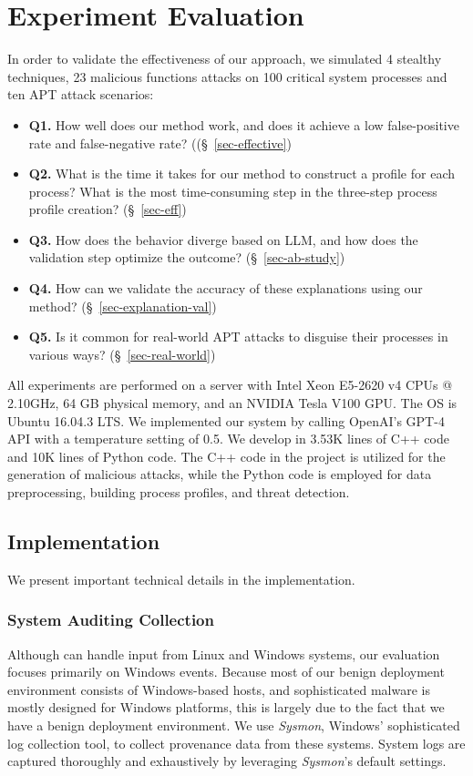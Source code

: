 \section{Experiment Evaluation}

In order to validate the effectiveness of our approach, we simulated 4 stealthy techniques, 23 malicious functions attacks on 100 critical system processes and ten APT attack scenarios:

\begin{itemize}
    \item \textbf{Q1.} How well does our method work, and does it achieve a low false-positive rate and false-negative rate? ((§~\ref{sec-effective})
    \item \textbf{Q2.} What is the time it takes for our method to construct a profile for each process? What is the most time-consuming step in the three-step process profile creation? (§~\ref{sec-eff})
    \item \textbf{Q3.} How does the behavior diverge based on LLM, and how does the validation step optimize the outcome? (§~\ref{sec-ab-study})
    \item \textbf{Q4.} How can we validate the accuracy of these explanations using our method? (§~\ref{sec-explanation-val})
    \item \textbf{Q5.} Is it common for real-world APT attacks to disguise their processes in various ways? (§~\ref{sec-real-world})
\end{itemize}
All experiments are performed on a server with Intel Xeon E5-2620 v4 CPUs @ 2.10GHz, 64 GB physical memory, and an NVIDIA Tesla V100 GPU. The OS is Ubuntu 16.04.3 LTS.
We implemented our system by calling OpenAI's GPT-4 API with a temperature setting of 0.5.
We develop \tool in 3.53K lines of C++ code and 10K lines of Python code.
The C++ code in the project is utilized for the generation of malicious attacks, while the Python code is employed for data preprocessing, building process profiles, and threat detection.


\subsection{Implementation}
We present important technical details in the implementation.

\subsubsection{System Auditing Collection}
Although \tool can handle input from Linux and Windows systems, our evaluation focuses primarily on Windows events. Because most of our benign deployment environment consists of Windows-based hosts, and sophisticated malware is mostly designed for Windows platforms, this is largely due to the fact that we have a benign deployment environment. We use \textit{Sysmon}, Windows' sophisticated log collection tool, to collect provenance data from these systems. System logs are captured thoroughly and exhaustively by leveraging \textit{Sysmon}'s default settings.

